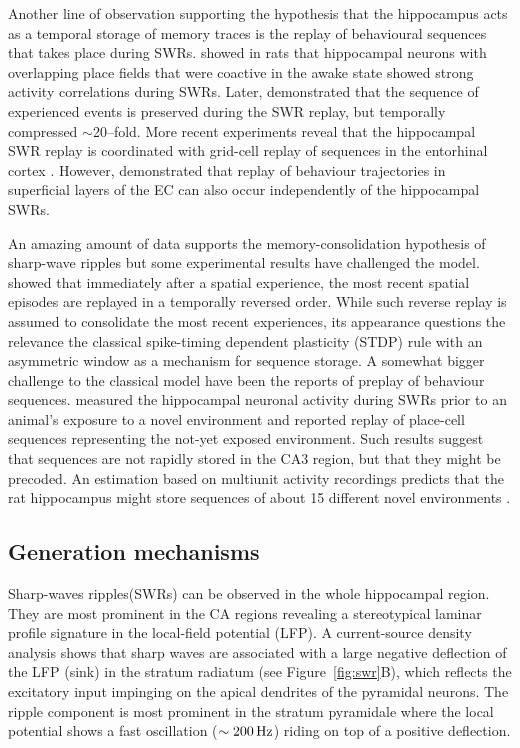     Another line of observation supporting the hypothesis that the hippocampus
    acts as a temporal storage of memory traces is the replay of behavioural
    sequences that takes place during SWRs. \cite{Wilson1994} showed in rats
    that hippocampal neurons with overlapping place fields that were coactive
    in the awake state showed strong activity correlations during SWRs. Later,
    \cite{Lee2002} demonstrated that the sequence of experienced events is
    preserved during the SWR replay, but temporally compressed $\sim$20--fold.
    More recent experiments reveal that the hippocampal SWR replay is
    coordinated with grid-cell replay of sequences in the entorhinal cortex
    \citep{Olafsdottir2016}. However, \cite{Oneill2017} demonstrated that
    replay of behaviour trajectories in superficial layers of the EC can also
    occur independently of the hippocampal SWRs.

    An amazing amount of data supports the memory-consolidation hypothesis of
    sharp-wave ripples but some experimental results have challenged
    the model. \cite{Foster2006} showed that immediately after a spatial
    experience, the most recent spatial episodes are replayed in a temporally
    reversed order. While such reverse replay is assumed to consolidate the
    most recent experiences, its appearance questions the relevance the
    classical spike-timing dependent plasticity (STDP) rule with an asymmetric
    window \citep{Bi1998} as a mechanism for sequence storage. A somewhat
    bigger challenge to the classical model have been the reports of preplay of
    behaviour sequences. \cite{Dragoi2011} measured the hippocampal neuronal activity
    during SWRs prior to an animal's exposure to a novel environment and reported
    replay of place-cell sequences representing the not-yet exposed
    environment. Such results suggest that sequences are not rapidly stored in
    the CA3 region, but that they might be precoded. An estimation based on
    multiunit activity recordings predicts that the rat hippocampus might store
    sequences of about 15 different novel environments \citep{Dragoi2013}.
    
  \subsection{Generation mechanisms}
    Sharp-waves ripples(SWRs) can be observed in the whole hippocampal region.
    They are most prominent in the CA regions revealing a stereotypical laminar
    profile signature in the local-field potential (LFP). A current-source
    density analysis shows that sharp waves are associated with a large
    negative deflection of the LFP (sink) in the stratum radiatum (see
    Figure~\ref{fig:swr}B), which reflects the excitatory input impinging on
    the apical dendrites of the pyramidal neurons. The ripple component is most
    prominent in the stratum pyramidale where the local potential shows a fast
    oscillation ($\sim200\rm \, Hz$) riding on top of a positive deflection.

